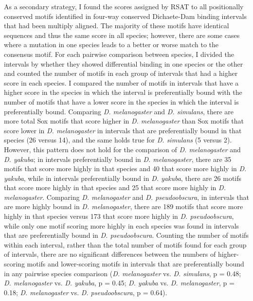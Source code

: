 As a secondary strategy, I found the scores assigned by RSAT to all positionally conserved motifs identified in four-way conserved Dichaete-Dam binding intervals that had been multiply aligned. The majority of these motifs have identical sequences and thus the same score in all species; however, there are some cases where a mutation in one species leads to a better or worse match to the consensus motif. For each pairwise comparison between species, I divided the intervals by whether they showed differential binding in one species or the other and counted the number of motifs in each group of intervals that had a higher score in each species. I compared the number of motifs in intervals that have a higher score in the species in which the interval is preferentially bound with the number of motifs that have a lower score in the species in which the interval is preferentially bound. Comparing \emph{D. melanogaster} and \emph{D. simulans}, there are more total Sox motifs that score higher in \emph{D. melanogaster} than Sox motifs that score lower in \emph{D. melanogaster} in intervals that are preferentially bound in that species (26 versus 14), and the same holds true for \emph{D. simulans} (5 versus 2). However, this pattern does not hold for the comparison of \emph{D. melanogaster} and \emph{D. yakuba}; in intervals preferentially bound in \emph{D. melanogaster}, there are 35 motifs that score more highly in that species and 40 that score more highly in \emph{D. yakuba}, while in intervals preferentially bound in \emph{D. yakuba}, there are 26 motifs that score more highly in that species and 25 that score more highly in \emph{D. melanogaster}. Comparing \emph{D. melanogaster} and \emph{D. pseudoobscura}, in intervals that are more highly bound in \emph{D. melanogaster}, there are 189 motifs that score more highly in that species versus 173 that score more highly in \emph{D. pseudoobscura}, while only one motif scoring more highly in each species was found in intervals that are preferentially bound in \emph{D. pseudoobscura}. Counting the number of motifs within each interval, rather than the total number of motifs found for each group of intervals, there are no significant differences between the numbers of higher-scoring motifs and lower-scoring motifs in intervals that are preferentially bound in any pairwise species comparison (\emph{D. melanogaster} vs. \emph{D. simulans}, p = 0.48; \emph{D. melanogaster} vs. \emph{D. yakuba}, p = 0.45; \emph{D. yakuba} vs. \emph{D. melanogaster}, p = 0.18; \emph{D. melanogaster} vs. \emph{D. pseudoobscura}, p = 0.64).\\

